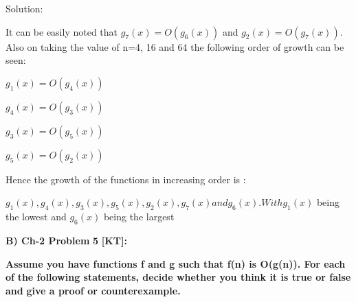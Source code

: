 \documentclass[letterpaper,portrait,12pt]{article}
\begin{document}
\begin{flushleft}
Solution:
\end{flushleft}


\begin{flushleft}
It can be easily noted that $g_7(x)=O(g_6(x))$ and $g_2(x)=O(g_7(x))$. Also on taking the value of n=4, 16 and 64 the following order of growth can be seen:
\end{flushleft}


\begin{flushleft}
$g_1(x)=O(g_4(x))$
\end{flushleft}


\begin{flushleft}
$g_4(x)=O(g_3(x))
$
\end{flushleft}


\begin{flushleft}
$g_3(x)=O(g_5(x))
$
\end{flushleft}


\begin{flushleft}
$g_5(x)=O(g_2(x))
$
\end{flushleft}


\begin{flushleft}
Hence the growth of the functions in increasing order is :
\end{flushleft}


\begin{flushleft}

\end{flushleft}


\begin{flushleft}
$g_1(x), g_4(x), g_3(x), g_5(x), g_2(x), g_7(x) and g_6(x). With g_1(x)$  being the lowest and $g_6(x) $ being the largest
\end{flushleft}


\begin{flushleft}

\end{flushleft}


\begin{flushleft}

\end{flushleft}


\begin{flushleft}
\textbf{B}\textbf{) Ch-2 Problem }\textbf{5}\textbf{ [KT]: }
\end{flushleft}


\begin{flushleft}
\textbf{	}\textbf{Assume you have functions f and g such that f(n) is O(g(n)). For each of}\textbf{ }\textbf{the following statements, decide whether you think it is true or false and}\textbf{ }\textbf{give a proof or counterexample.}
\end{flushleft}
\end{document}
